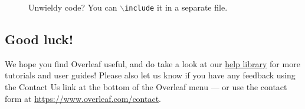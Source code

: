 \documentclass{article}
\begin{document}
\begin{figure}
    \centering
    
    \caption{Unwieldy code? You can \texttt{$\backslash$include} it in a separate file. }
    \label{fig:tikz2}
\end{figure}


\subsection{Good luck!}

We hope you find Overleaf useful, and do take a look at our \href{https://www.overleaf.com/learn}{help library} for more tutorials and user guides! Please also let us know if you have any feedback using the Contact Us link at the bottom of the Overleaf menu --- or use the contact form at \url{https://www.overleaf.com/contact}.



\end{document}
